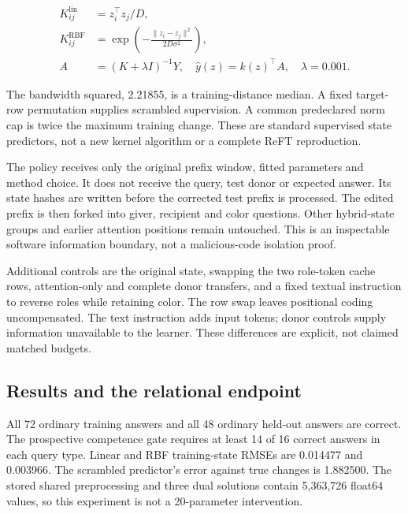 \documentclass[11pt,letterpaper]{article}
\begin{document}
\begin{equation}
\begin{aligned}
K^{\mathrm{lin}}_{ij}&=z_i^\top z_j/D,\\
K^{\mathrm{RBF}}_{ij}&=\exp\!\left(-\frac{\lVert z_i-z_j\rVert^2}{2D\sigma^2}\right),\\
A&=(K+\lambda I)^{-1}Y,\quad \widehat{y}(z)=k(z)^\top A,\quad\lambda=0.001.
\end{aligned} \tag{8}
\end{equation}

The bandwidth squared, 2.21855, is a training-distance median. A fixed target-row permutation supplies scrambled supervision. A common predeclared norm cap is twice the maximum training change. These are standard supervised state predictors, not a new kernel algorithm or a complete ReFT reproduction.

The policy receives only the original prefix window, fitted parameters and method choice. It does not receive the query, test donor or expected answer. Its state hashes are written before the corrected test prefix is processed. The edited prefix is then forked into giver, recipient and color questions. Other hybrid-state groups and earlier attention positions remain untouched. This is an inspectable software information boundary, not a malicious-code isolation proof.

Additional controls are the original state, swapping the two role-token cache rows, attention-only and complete donor transfers, and a fixed textual instruction to reverse roles while retaining color. The row swap leaves positional coding uncompensated. The text instruction adds input tokens; donor controls supply information unavailable to the learner. These differences are explicit, not claimed matched budgets.

\subsection{Results and the relational endpoint}

All 72 ordinary training answers and all 48 ordinary held-out answers are correct. The prospective competence gate requires at least 14 of 16 correct answers in each query type. Linear and RBF training-state RMSEs are 0.014477 and 0.003966. The scrambled predictor's error against true changes is 1.882500. The stored shared preprocessing and three dual solutions contain 5,363,726 float64 values, so this experiment is not a 20-parameter intervention.
\end{document}
